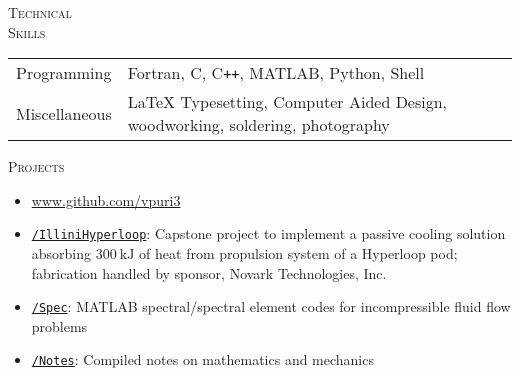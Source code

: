\documentclass[10pt]{article}
\begin{document}
\vspace{-1.5em}
\begin{multicols}{2}
\textsc{\small Technical \\ Skills}
\columnbreak

\begin {table}[H]
\begin{tabular}{l l }
\hspace{-0.5em}Programming   & \hspace{-0.0em}Fortran, C, C\texttt{++}, MATLAB, Python, Shell\\
\hspace{-0.5em}Miscellaneous & \hspace{-0.0em}\LaTeX{} Typesetting, Computer Aided Design, woodworking, soldering, photography \\
\end{tabular}	
\end{table}

\vspace{-1.0em}
\end{multicols}
\vspace{-1.5em}
\begin{multicols}{2}
\textsc{\small Projects} %
\columnbreak

\vspace{-2.0em}
\begin{itemize}[label=-]
    \setlength{\itemindent}{-1.5em}
    \setlength\itemsep{-0.5\itemsep}
    \item[] \url{www.github.com/vpuri3}
    \item \href{https://github.com/vpuri3/IlliniHyperloop}{\texttt{/IlliniHyperloop}}: Capstone project to implement a passive cooling solution absorbing $\SI{300}{\kilo \joule}$ of heat from propulsion system of a Hyperloop pod; fabrication handled by sponsor, Novark Technologies, Inc.
    \item \href{https://github.com/vpuri3/Spec}{\texttt{/Spec}}: MATLAB spectral/spectral element codes for incompressible fluid flow problems
    \item \href{https://github.com/vpuri3/Notes}{\texttt{/Notes}}: Compiled notes on mathematics and mechanics
\end{itemize}
\vspace{-2.0em}

\end{multicols}
\vspace{-1.5em}
\vfill
\end{document}
